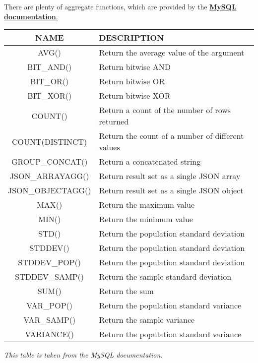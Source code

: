 \noindent
There are plenty of aggregate functions, which are provided by the \underline{\textbf{MySQL documentation}.}\\

\vspace{1em}

\begin{tabular}{|c|p{8cm}|}
    \hline
    \rowcolor{OliveGreen!10} \textbf{NAME} & \textbf{DESCRIPTION}                             \\
    \hline
    AVG()                                  & Return the average value of the argument         \\
    \rowcolor{black!5} BIT\_AND()          & Return bitwise AND                               \\
    BIT\_OR()                              & Return bitwise OR                                \\
    \rowcolor{black!5} BIT\_XOR()          & Return bitwise XOR                               \\
    COUNT()                                & Return a count of the number of rows returned    \\
    \rowcolor{black!5} COUNT(DISTINCT)     & Return the count of a number of different values \\
    GROUP\_CONCAT()                        & Return a concatenated string                     \\
    \rowcolor{black!5} JSON\_ARRAYAGG()    & Return result set as a single JSON array         \\
    JSON\_OBJECTAGG()                      & Return result set as a single JSON object        \\
    \rowcolor{black!5} MAX()               & Return the maximum value                         \\
    MIN()                                  & Return the minimum value                         \\
    \rowcolor{black!5} STD()               & Return the population standard deviation         \\
    STDDEV()                               & Return the population standard deviation         \\
    \rowcolor{black!5} STDDEV\_POP()       & Return the population standard deviation         \\
    STDDEV\_SAMP()                         & Return the sample standard deviation             \\
    \rowcolor{black!5} SUM()               & Return the sum                                   \\
    VAR\_POP()                             & Return the population standard variance          \\
    \rowcolor{black!5} VAR\_SAMP()         & Return the sample variance                       \\
    VARIANCE()                             & Return the population standard variance          \\
    \hline
\end{tabular}

\vspace{1em}
\begin{centering}
    \textit{This table is taken from the MySQL documentation.\\}
\end{centering}

\noindent
